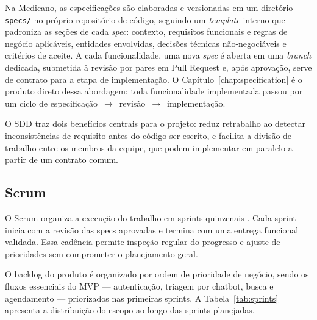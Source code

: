 Na Medicano, as especificações são elaboradas e
versionadas em um diretório \texttt{specs/} no próprio
repositório de código, seguindo um \textit{template}
interno que padroniza as seções de cada \textit{spec}:
contexto, requisitos funcionais e regras de negócio
aplicáveis, entidades envolvidas, decisões técnicas
não-negociáveis e critérios de aceite. A cada
funcionalidade, uma nova \textit{spec} é aberta em uma
\textit{branch} dedicada, submetida à revisão por pares
em Pull Request e, após aprovação, serve de contrato
para a etapa de implementação.
O Capítulo~\ref{chap:specification} é o produto
direto dessa abordagem: toda funcionalidade
implementada passou por um ciclo de
especificação~$\rightarrow$~revisão~$\rightarrow$~implementação.

O SDD traz dois benefícios centrais para o projeto:
reduz retrabalho ao detectar inconsistências de
requisito antes do código ser escrito, e facilita
a divisão de trabalho entre os membros da equipe,
que podem implementar em paralelo a partir de um
contrato comum.

\subsection{Scrum}
\label{subsec:scrum}

O Scrum organiza a execução do trabalho em sprints
quinzenais \cite{schwaber2020}. Cada sprint inicia
com a revisão das specs aprovadas e termina com uma
entrega funcional validada. Essa cadência permite
inspeção regular do progresso e ajuste de prioridades
sem comprometer o planejamento geral.

O backlog do produto é organizado por ordem de
prioridade de negócio, sendo os fluxos essenciais do
MVP — autenticação, triagem por chatbot, busca e
agendamento — priorizados nas primeiras sprints. A
Tabela~\ref{tab:sprints} apresenta a distribuição do
escopo ao longo das sprints planejadas.

